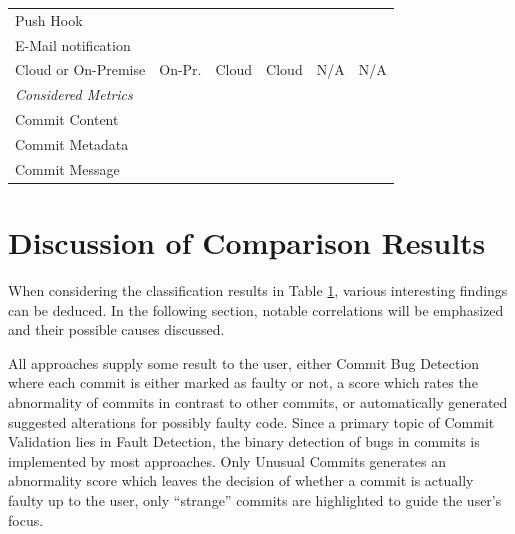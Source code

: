 \begin{table}[p]
\begin{tabular}{@{}lccccc@{}}
		Push Hook & \pointno & \pointyes & \pointno & \pnotapplicable & \pnotapplicable \\
		E-Mail notification & \pnotapplicable & \pointyes & \pointno & \pnotapplicable & \pnotapplicable \\
		Cloud or On-Premise & On-Pr. & Cloud & Cloud & N/A & N/A \\ \midrule
		\textit{Considered Metrics} & & & & & \\
		Commit Content & \pointyes & \pointyes & \pointyes & \pointyes & \pointyes \\
		Commit Metadata & \pointno & \pointno & \pointyes & \pointno & \pointno \\
		Commit Message & \pointyes & \pointyes & \pointno & \pointyes & \pointyes \\ \bottomrule
	\end{tabular}
	\label{tab:classification}
\end{table}

\section{Discussion of Comparison Results}
\label{sec:discussion}


When considering the classification results in Table \ref{tab:classification}, various interesting findings can be deduced. In the following section, notable correlations will be emphasized and their possible causes discussed.

All approaches supply some result to the user, either Commit Bug Detection where each commit is either marked as faulty or not, a score which rates the abnormality of commits in contrast to other commits, or automatically generated suggested alterations for possibly faulty code. Since a primary topic of Commit Validation lies in Fault Detection, the binary detection of bugs in commits is implemented by most approaches. Only Unusual Commits \cite{Goyal2017} generates an abnormality score which leaves the decision of whether a commit is actually faulty up to the user, only ``strange'' commits are highlighted to guide the user's focus.

